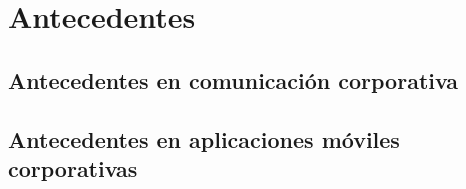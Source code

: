 \section{Antecedentes}
\subsection{Antecedentes en comunicación corporativa}

\subsection{Antecedentes en aplicaciones móviles corporativas}